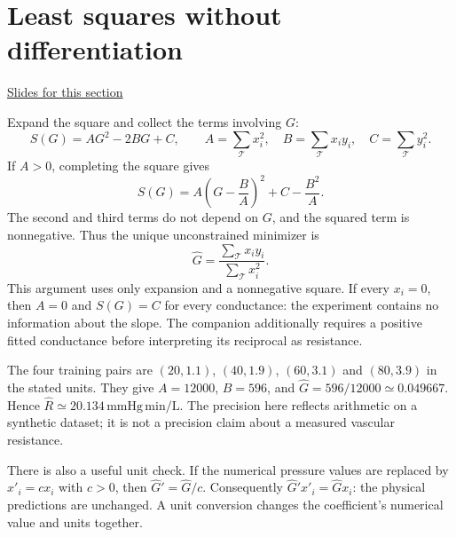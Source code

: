\documentclass[11pt,letterpaper]{article}
\theoremstyle{definition}\newtheorem{definition}{Definition}\newtheorem{example}{Example}
\numberwithin{equation}{section}
\begin{document}
\section{Least squares without differentiation}
\hypertarget{note-least-squares-without-differentiation}{}\label{note:least-squares-without-differentiation}
{\small \href{slides.html\#frame=define-the-discrepancy\&step=1}{Slides for this section}}\par
Expand the square and collect the terms involving $G$:
\begin{equation}S(G)=AG^2-2BG+C,\qquad
A=\sum_{\mathcal T}x_i^2,\quad B=\sum_{\mathcal T}x_iy_i,\quad C=\sum_{\mathcal T}y_i^2.
\end{equation}
If $A>0$, completing the square gives
\begin{equation}S(G)=A\left(G-\frac BA\right)^2+C-\frac{B^2}{A}.\end{equation}
The second and third terms do not depend on $G$, and the squared term is nonnegative. Thus the unique unconstrained minimizer is
\begin{equation}\widehat G=\frac{\sum_{\mathcal T}x_iy_i}{\sum_{\mathcal T}x_i^2}.\label{eq:conductance-fit}\end{equation}
This argument uses only expansion and a nonnegative square. If every $x_i=0$, then $A=0$ and $S(G)=C$ for every conductance: the experiment contains no information about the slope. The companion additionally requires a positive fitted conductance before interpreting its reciprocal as resistance.

The four training pairs are $(20,1.1)$, $(40,1.9)$, $(60,3.1)$ and $(80,3.9)$ in the stated units. They give $A=12000$, $B=596$, and $\widehat G=596/12000\simeq0.049667$. Hence $\widehat R\simeq20.134\,\mathrm{mmHg\,min/L}$. The precision here reflects arithmetic on a synthetic dataset; it is not a precision claim about a measured vascular resistance.

There is also a useful unit check. If the numerical pressure values are replaced by $x'_i=cx_i$ with $c>0$, then $\widehat G'=\widehat G/c$. Consequently $\widehat G'x'_i=\widehat Gx_i$: the physical predictions are unchanged. A unit conversion changes the coefficient's numerical value and units together.
\end{document}
